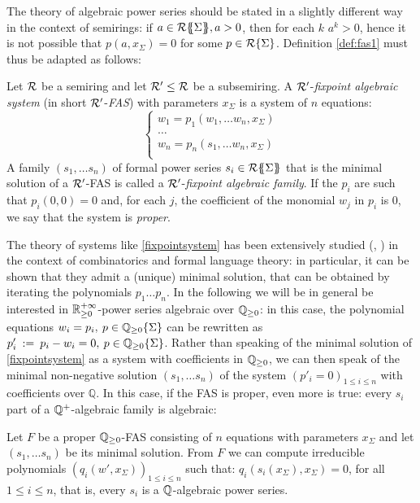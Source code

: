   The theory of algebraic power series should be stated in a slightly different way in the context of semirings: if $a \in {\mathcal{R}}\{\!\!\{\Sigma\}\!\!\}, a > 0$, then for each $k$ $a^k > 0$, hence it is not possible that $p(a, x_\Sigma)=0$ for some $p \in {\mathcal{R}}\{\Sigma\}$. Definition \ref{def:fas1} must thus be adapted as follows:
     \begin{definition}
     	\label{def:fas2}
	Let $\mathcal{R}$ be a semiring and let $\mathcal{R}'\leq \mathcal{R}$ be a subsemiring. A  $\mathcal{R}'$-\emph{fixpoint algebraic system} (in short $\mathcal{R}'$-\emph{FAS}) with parameters $x_\Sigma$ is a system of $n$ equations:
	 \begin{equation}
		\label{fixpointsystem}
		\begin{cases}
			w_1 = p_1(w_1, \dots w_n, x_\Sigma)\\
			\dots\\
			w_n = p_n(s_1, \dots w_n, x_\Sigma)\\
		\end{cases}
		\end{equation}
	A family $(s_1, \dots s_n)$ of formal power series $s_i \in {\mathcal{R}}\{\!\!\{\Sigma\}\!\!\}$ that is the minimal solution of a $\mathcal{R}'$-FAS is called a $\mathcal{R}'$-\emph{fixpoint algebraic family}. 
	If the $p_i$ are such that $p_i(0,0)=0$ and, for each $j$, the coefficient of the monomial $w_j$ in $p_i$ is $0$, we say that the system is \emph{proper}.
\end{definition}
	The theory of systems like \eqref{fixpointsystem} has been extensively studied (\cite{DBLP:books/sp/KuichS86}, \cite{DBLP:journals/cpc/BanderierD15}) in the context of combinatorics and formal language theory: in particular, it can be shown that they admit a (unique) minimal solution, that can be obtained by iterating the polynomials $p_1 \dots p_n$. In the following we will be in general be interested in ${\mathbb{R}^{+\infty}_{\geq 0}}$-power series algebraic over $\mathbb{Q}_{\geq 0}$: in this case, the polynomial equations $w_i= p_i, \: p \in {\mathbb{Q}_{\geq 0}}\{\Sigma\}$ can be rewritten as $p'_i \: := \: p_i- w_i = 0, \: p \in {\mathbb{Q}_{\geq 0}}\{\Sigma\}$. Rather than speaking of the minimal solution of \eqref{fixpointsystem} as a system with coefficients in $\mathbb{Q}_{\geq 0}$, we can then speak of the minimal non-negative solution $(s_1, \dots s_n)$  of the system $(p'_i=0)_{1 \leq i \leq n}$ with coefficients over $\mathbb{Q}$.
	In this case, if the FAS is proper, even more is true: every $s_i$ part of a $\mathbb{Q}^+$-algebraic family is algebraic:
 	\begin{theorem}
 		\label{th:elimination}
 		Let $F$ be a proper $\mathbb{Q}_{\geq 0}$-FAS consisting of $n$ equations with parameters $x_\Sigma$ and let $(s_1, \dots s_n)$ be its minimal solution. From $F$ we can  compute irreducible polynomials $(q_i(w' , x_\Sigma))_{1 \leq i \leq n}$ such that:
 		$q_i(s_i(x_\Sigma), x_\Sigma)=0$, for all $1 \leq i \leq n$, 
 		that is, every $s_i$ is a $\mathbb{Q}$-algebraic power series.
 	\end{theorem}
